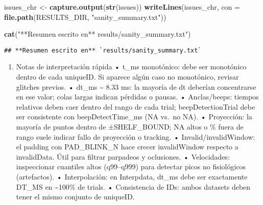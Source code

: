 \documentclass[
]{article}
\newenvironment{Shaded}{\begin{snugshade}}{\end{snugshade}}
\newcommand{\AttributeTok}[1]{\textcolor[rgb]{0.13,0.29,0.53}{#1}}
\newcommand{\FunctionTok}[1]{\textcolor[rgb]{0.13,0.29,0.53}{\textbf{#1}}}
\newcommand{\NormalTok}[1]{#1}
\newcommand{\OtherTok}[1]{\textcolor[rgb]{0.56,0.35,0.01}{#1}}
\newcommand{\StringTok}[1]{\textcolor[rgb]{0.31,0.60,0.02}{#1}}
\providecommand{\tightlist}{%
  \setlength{\itemsep}{0pt}\setlength{\parskip}{0pt}}
\begin{document}
\begin{Shaded}
\begin{Highlighting}[]
\NormalTok{issues\_chr }\OtherTok{\textless{}{-}} \FunctionTok{capture.output}\NormalTok{(}\FunctionTok{str}\NormalTok{(issues))}
\FunctionTok{writeLines}\NormalTok{(issues\_chr, }\AttributeTok{con =} \FunctionTok{file.path}\NormalTok{(RESULTS\_DIR, }\StringTok{"sanity\_summary.txt"}\NormalTok{))}

\FunctionTok{cat}\NormalTok{(}\StringTok{"**Resumen escrito en** \textasciigrave{}results/sanity\_summary.txt\textasciigrave{}"}\NormalTok{)}
\end{Highlighting}
\end{Shaded}

\begin{verbatim}
## **Resumen escrito en** `results/sanity_summary.txt`
\end{verbatim}

\begin{enumerate}
\def\labelenumi{\arabic{enumi}.}
\setcounter{enumi}{10}
\tightlist
\item
  Notas de interpretación rápida • t\_ms monotónico: debe ser monotónico
  dentro de cada uniqueID. Si aparece algún caso no monotónico, revisar
  glitches previos. • dt\_ms \textasciitilde{} 8.33 ms: la mayoría de dt
  deberían concentrarse en ese valor; colas largas indican pérdidas o
  pausas. • Anclas/beeps: tiempos relativos deben caer dentro del rango
  de cada trial; beepDetectionTrial debe ser consistente con
  beepDetectTime\_ms (NA vs.~no NA). • Proyección: la mayoría de puntos
  dentro de ±SHELF\_BOUND; NA altos o \% fuera de rango suele indicar
  fallo de proyección o tracking. • Invalid/invalidWindow: el padding
  con PAD\_BLINK\_N hace crecer invalidWindow respecto a invalidData.
  Útil para filtrar parpadeos y oclusiones. • Velocidades: inspeccionar
  cuantiles altos (q99--q999) para detectar picos no fisiológicos
  (artefactos). • Interpolación: en Interpdata, dt\_ms debe ser
  exactamente DT\_MS en \textasciitilde100\% de trials. • Consistencia
  de IDs: ambos datasets deben tener el mismo conjunto de uniqueID.
\end{enumerate}
\end{document}

